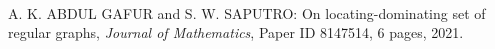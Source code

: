 \bigskip

\begin{center}
\\

\medskip


\end{center}

\begin{thebibliography}{999}
%
%
%
%
%
%
%
%
%
%
%

A. K. ABDUL GAFUR and S. W. SAPUTRO: On locating-dominating set of regular graphs, {\it Journal of Mathematics}, Paper ID 8147514, 6 pages, 2021.


\end{thebibliography}
